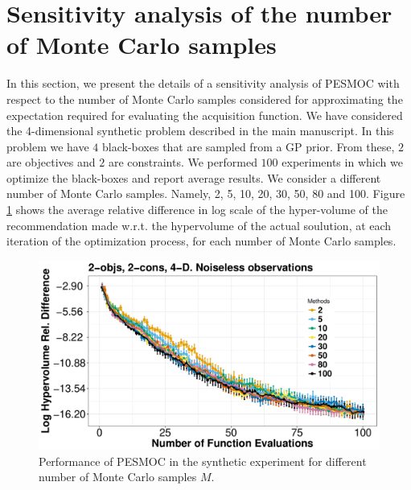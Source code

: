 \documentclass[review,preprint,12pt]{elsarticle}
\begin{document}
\section{Sensitivity analysis of the number of Monte Carlo samples}

In this section, we present the details of a sensitivity analysis of PESMOC with respect to the number of Monte Carlo samples
considered for approximating the expectation required for evaluating the acquisition function. We have considered the 4-dimensional 
synthetic problem described in the main manuscript.  In this problem we have $4$ black-boxes that are sampled from a GP prior. From these, $2$ are 
objectives and $2$ are constraints. We performed $100$ experiments in which we optimize the black-boxes and report average
results. We consider a different number of Monte Carlo samples. Namely, 2, 5, 10, 20, 30, 50, 80 and 100. Figure \ref{fig:mciters}
shows the average relative difference in log scale of the hyper-volume of the recommendation made w.r.t. the hypervolume of the
actual soulution, at each iteration of the optimization process, for each number of Monte Carlo samples. 

\begin{figure}[h!]
        \begin{center}
        \includegraphics[width=0.75\linewidth]{../figures/revision/mciters.pdf}
        \caption{Performance of PESMOC in the synthetic experiment for different number of Monte Carlo samples $M$.}
        \end{center}
        \label{fig:mciters}
\end{figure}
\end{document}
